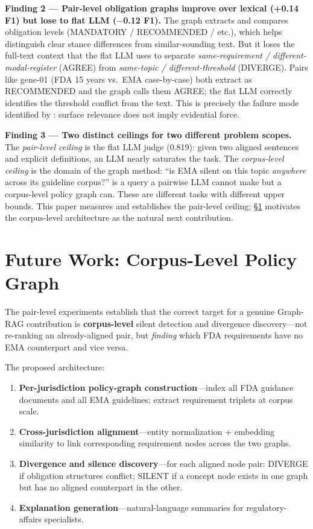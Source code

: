 \documentclass[sigconf]{acmart}
\begin{document}
\textbf{Finding 2 --- Pair-level obligation graphs improve over lexical (+0.14
F1) but lose to flat LLM ($-$0.12 F1).} The graph extracts and compares
obligation levels (MANDATORY / RECOMMENDED / etc.), which helps distinguish
clear stance differences from similar-sounding text. But it loses the
full-text context that the flat LLM uses to separate
\textit{same-requirement / different-modal-register} (AGREE) from
\textit{same-topic / different-threshold} (DIVERGE). Pairs like gene-01 (FDA
15 years vs.\ EMA case-by-case) both extract as RECOMMENDED and the graph
calls them AGREE; the flat LLM correctly identifies the threshold conflict from
the text. This is precisely the failure mode identified by
\citet{qian2026evidenceforce}: surface relevance does not imply evidential
force.

\textbf{Finding 3 --- Two distinct ceilings for two different problem scopes.}
The \textit{pair-level ceiling} is the flat LLM judge (0.819): given two
aligned sentences and explicit definitions, an LLM nearly saturates the task.
The \textit{corpus-level ceiling} is the domain of the graph method: ``is EMA
silent on this topic \textit{anywhere} across its guideline corpus?'' is a
query a pairwise LLM cannot make but a corpus-level policy graph can. These
are different tasks with different upper bounds. This paper measures and
establishes the pair-level ceiling; \S\ref{sec:futurework} motivates the
corpus-level architecture as the natural next contribution.

\section{Future Work: Corpus-Level Policy Graph}
\label{sec:futurework}

The pair-level experiments establish that the correct target for a genuine
Graph-RAG contribution is \textbf{corpus-level} silent detection and divergence
discovery---not re-ranking an already-aligned pair, but \textit{finding} which
FDA requirements have no EMA counterpart and vice versa.

The proposed architecture:
\begin{enumerate}
\item \textbf{Per-jurisdiction policy-graph construction}---index all FDA
  guidance documents and all EMA guidelines; extract requirement triplets at
  corpus scale.
\item \textbf{Cross-jurisdiction alignment}---entity normalization +
  embedding similarity to link corresponding requirement nodes across the two
  graphs.
\item \textbf{Divergence and silence discovery}---for each aligned node pair:
  DIVERGE if obligation structures conflict; SILENT if a concept node exists in
  one graph but has no aligned counterpart in the other.
\item \textbf{Explanation generation}---natural-language summaries for
  regulatory-affairs specialists.
\end{enumerate}
\end{document}
